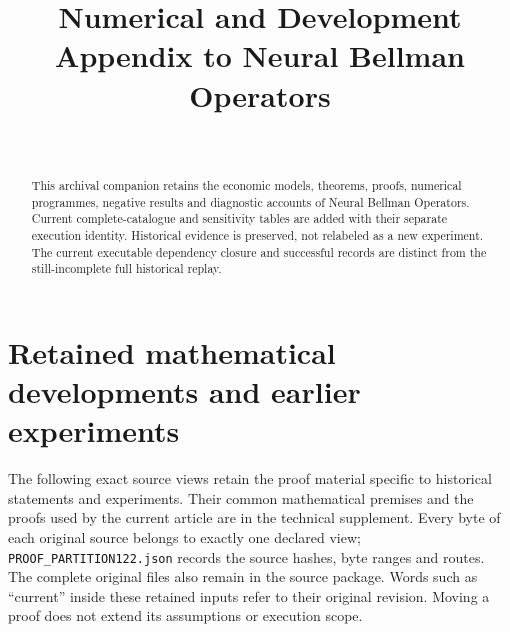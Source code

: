 \documentclass[ecta,nameyear,draft]{econsocart}
\begin{document}
\begin{frontmatter}
\title{Numerical and Development Appendix to Neural Bellman Operators}
\begin{aug}
\author[id=au1,addressref={add1}]{~}
\address[id=add1]{Peking University}
\end{aug}
\begin{abstract}This archival companion retains the economic models, theorems, proofs, numerical programmes, negative results and diagnostic accounts of Neural Bellman Operators. Current complete-catalogue and sensitivity tables are added with their separate execution identity. Historical evidence is preserved, not relabeled as a new experiment. The current executable dependency closure and successful records are distinct from the still-incomplete full historical replay.\end{abstract}
\end{frontmatter}
\appendix
\renewcommand{\thetheorem}{A.\arabic{theorem}}
\renewcommand{\theequation}{A.\arabic{equation}}
\renewcommand{\thesection}{\AlphAlph{\value{section}}}

\section{Retained mathematical developments and earlier experiments}
\label{dev:proofpartition122}
The following exact source views retain the proof material specific to
historical statements and experiments. Their common mathematical premises
and the proofs used by the current article are in the technical supplement.
Every byte of each original source belongs to exactly one declared view;
\texttt{PROOF\_PARTITION122.json} records the source hashes, byte ranges
and routes. The complete original files also remain in the source package.
Words such as ``current'' inside these retained inputs refer to their original
revision. Moving a proof does not extend its assumptions or execution scope.















\end{document}
